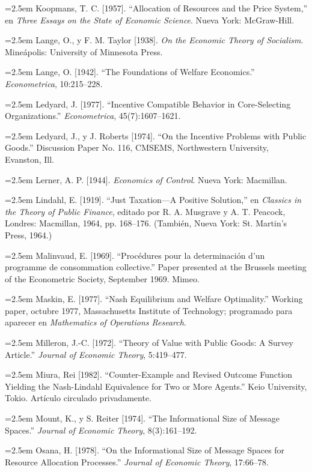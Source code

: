 \documentclass[12pt, letterpaper]{article}
\newcommand{\bibentry}[1]{\noindent\hangindent=2.5em\hangafter=1 \small #1 \par\vspace{0.75em}}
\begin{document}
\bibentry{Koopmans, T. C. [1957]. ``Allocation of Resources and the Price System,'' en \textit{Three Essays on the State of Economic Science}. Nueva York: McGraw-Hill.}

\bibentry{Lange, O., y F. M. Taylor [1938]. \textit{On the Economic Theory of Socialism}. Mineápolis: University of Minnesota Press.}

\bibentry{Lange, O. [1942]. ``The Foundations of Welfare Economics.'' \textit{Econometrica}, 10:215--228.}

\bibentry{Ledyard, J. [1977]. ``Incentive Compatible Behavior in Core-Selecting Organizations.'' \textit{Econometrica}, 45(7):1607--1621.}

\bibentry{Ledyard, J., y J. Roberts [1974]. ``On the Incentive Problems with Public Goods.'' Discussion Paper No. 116, CMSEMS, Northwestern University, Evanston, Ill.}

\bibentry{Lerner, A. P. [1944]. \textit{Economics of Control}. Nueva York: Macmillan.}

\bibentry{Lindahl, E. [1919]. ``Just Taxation---A Positive Solution,'' en \textit{Classics in the Theory of Public Finance}, editado por R. A. Musgrave y A. T. Peacock, Londres: Macmillan, 1964, pp. 168--176. (También, Nueva York: St. Martin's Press, 1964.)}

\bibentry{Malinvaud, E. [1969]. ``Procédures pour la determinación d'un programme de consommation collective.'' Paper presented at the Brussels meeting of the Econometric Society, September 1969. Mimeo.}

\bibentry{Maskin, E. [1977]. ``Nash Equilibrium and Welfare Optimality.'' Working paper, octubre 1977, Massachusetts Institute of Technology; programado para aparecer en \textit{Mathematics of Operations Research}.}

\bibentry{Milleron, J.-C. [1972]. ``Theory of Value with Public Goods: A Survey Article.'' \textit{Journal of Economic Theory}, 5:419--477.}

\bibentry{Miura, Rei [1982]. ``Counter-Example and Revised Outcome Function Yielding the Nash-Lindahl Equivalence for Two or More Agents.'' Keio University, Tokio. Artículo circulado privadamente.}

\bibentry{Mount, K., y S. Reiter [1974]. ``The Informational Size of Message Spaces.'' \textit{Journal of Economic Theory}, 8(3):161--192.}

\bibentry{Osana, H. [1978]. ``On the Informational Size of Message Spaces for Resource Allocation Processes.'' \textit{Journal of Economic Theory}, 17:66--78.}
\end{document}
